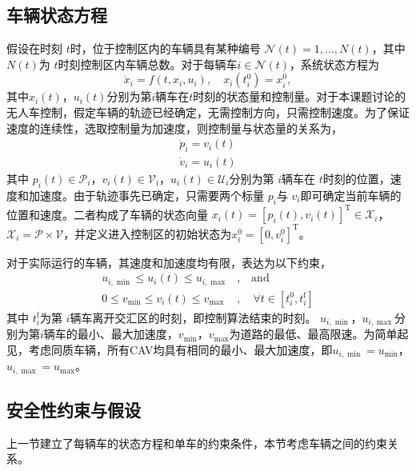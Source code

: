 \subsection{车辆状态方程}
假设在时刻 $t$时，位于控制区内的车辆具有某种编号 $\mathcal{N}(t)={1,\dots,N(t)}$，其中 $N(t)$为 $t$时刻控制区内车辆总数。对于每辆车$i\in \mathcal{N}(t)$，系统状态方程为
\begin{equation}
\dot{x}_i=f(t,x_i,u_i),\quad x_i(t_i^0)=x_i^0,
\end{equation}
其中$x_i(t)$，$u_i(t)$分别为第$i$辆车在$t$时刻的状态量和控制量。对于本课题讨论的无人车控制，假定车辆的轨迹已经确定，无需控制方向，只需控制速度。为了保证速度的连续性，选取控制量为加速度，则控制量与状态量的关系为，
\begin{equation}
\begin{gathered}
\dot{p}_i=v_i(t)\\
\dot{v}_i=u_i(t)
\end{gathered}
\label{eq:state}
\end{equation}
其中 $p_i(t)\in \mathcal{P}_i$，$v_i(t)\in \mathcal{V}_i$，$u_i(t)\in \mathcal{U}_i$分别为第 $i$辆车在 $t$时刻的位置，速度和加速度。由于轨迹事先已确定，只需要两个标量 $p_i$与 $v_i$即可确定当前车辆的位置和速度。二者构成了车辆的状态向量 $x_i(t)=[p_i(t), v_i(t)]^\mathrm{T}\in \mathcal{X}_i$，$\mathcal{X}_i=\mathcal{P}\times\mathcal{V}$，并定义进入控制区的初始状态为$x_i^0 = [0, v_i^0]^\mathrm{T}$。

对于实际运行的车辆，其速度和加速度均有限，表达为以下约束，
\begin{equation}
\begin{aligned}
u_{i,\min}\leq u_i(t)\leq u_{i,\max}&, \quad \text{and}\\
0\leq v_{\min}\leq v_i(t)\leq v_{\max}&, \quad \forall t\in[t_i^0, t_i^\mathrm{f}]
\end{aligned}
\label{eq:single_constraint}
\end{equation}
其中 $t_i^\mathrm{f}$为第 $i$辆车离开交汇区的时刻，即控制算法结束的时刻。 $u_{i,\min}$，$u_{i,\max}$分别为第$i$辆车的最小、最大加速度，$v_{\min}$，$v_{\max}$为道路的最低、最高限速。为简单起见，考虑同质车辆，所有CAV均具有相同的最小、最大加速度，即$u_{i,\min}=u_{\min}$，$u_{i,\max}=u_{\max}$。

\subsection{安全性约束与假设}
上一节建立了每辆车的状态方程和单车的约束条件，本节考虑车辆之间的约束关系。

